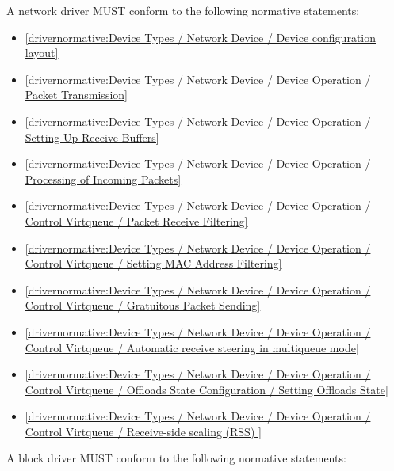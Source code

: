 \label{sec:Conformance / Driver Conformance / Network Driver Conformance}

A network driver MUST conform to the following normative statements:

\begin{itemize}
\item \ref{drivernormative:Device Types / Network Device / Device configuration layout}
\item \ref{drivernormative:Device Types / Network Device / Device Operation / Packet Transmission}
\item \ref{drivernormative:Device Types / Network Device / Device Operation / Setting Up Receive Buffers}
\item \ref{drivernormative:Device Types / Network Device / Device Operation / Processing of Incoming Packets}
\item \ref{drivernormative:Device Types / Network Device / Device Operation / Control Virtqueue / Packet Receive Filtering}
\item \ref{drivernormative:Device Types / Network Device / Device Operation / Control Virtqueue / Setting MAC Address Filtering}
\item \ref{drivernormative:Device Types / Network Device / Device Operation / Control Virtqueue / Gratuitous Packet Sending}
\item \ref{drivernormative:Device Types / Network Device / Device Operation / Control Virtqueue / Automatic receive steering in multiqueue mode}
\item \ref{drivernormative:Device Types / Network Device / Device Operation / Control Virtqueue / Offloads State Configuration / Setting Offloads State}
\item \ref{drivernormative:Device Types / Network Device / Device Operation / Control Virtqueue / Receive-side scaling (RSS) }
\end{itemize}

\label{sec:Conformance / Driver Conformance / Block Driver Conformance}

A block driver MUST conform to the following normative statements:

